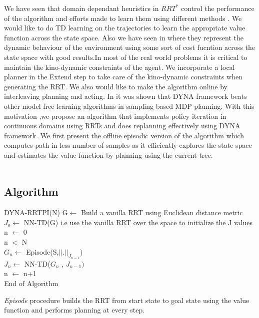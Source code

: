 \documentclass[MTech]{iitmdiss}
\begin{document}
We have seen that domain dependant heuristics in $RRT^*$ control the performance of the algorithm and efforts made to learn them using different methods \cite{perez12} . We would like to do TD learning on the trajectories to learn the appropriate value function across the state space. Also we have seen in \cite{svestrup10} where they represent the dynamic behaviour of the environment using some sort of cost fucntion across the state space with good results.In most of the real world problems it is critical to maintain the kino-dynamic constraints of the agent. We incorporate a local planner in the Extend step to take care of the kino-dynamic constraints when generating the RRT. We also would like to make the algorithm online by interleaving planning and acting. In \cite{dyna92} it was shown that DYNA framework beats other model free learning algorithms in sampling based MDP planning. With this motivation ,we propose an algorithm that implements policy iteration in continuous domains using RRTs and does replanning effectively using DYNA framework.  We first present the offline episodic version of the algorithm which computes path in less number of samples as it efficiently explores the state space and estimates the value function by planning using the current tree. 
\\
\\
\subsection{Algorithm}

\begin{algorithm}{DYNA-RRTPI(N)}{
\label{algo:DYNA-RRTPI}
}
G$\leftarrow$ Build a vanilla RRT using Euclidean distance metric\\
$J_o \leftarrow$ NN-TD(G) i.e use the vanilla RRT over the space to initialize the J values\\ 
n $\leftarrow$ 0\\
\qwhile n $<$ N \\
$G_n \leftarrow$ Episode(S,$ || . ||_{J_{n-1}} $)\\
$J_n \leftarrow$ NN-TD($G_n$ , $J_{n-1})$ \\
n $\leftarrow$ n+1\qend\\
End of Algorithm
\end{algorithm}

\emph{Episode} procedure builds the RRT from start state to goal state using the value function and performs planning at every step.
\end{document}
